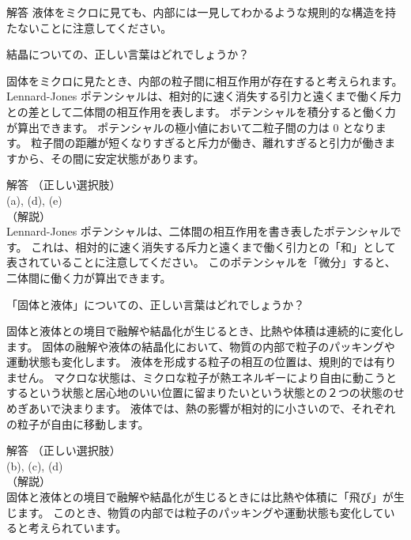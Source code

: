 \documentclass[uplatex,dvipdfmx,a4paper,11pt]{jsarticle}
\begin{document}
\begin{qlist}
\begin{itembox}[l]{解答}
            液体をミクロに見ても、内部には一見してわかるような規則的な構造を持たないことに注意してください。
        \end{itembox}
	\qitem 結晶についての、正しい言葉はどれでしょうか？
		\begin{qlist2}
			\qitem 固体をミクロに見たとき、内部の粒子間に相互作用が存在すると考えられます。
			\qitem Lennard-Jones ポテンシャルは、相対的に速く消失する引力と遠くまで働く斥力との差として二体間の相互作用を表します。
			\qitem ポテンシャルを積分すると働く力が算出できます。
			\qitem ポテンシャルの極小値において二粒子間の力は 0 となります。
			\qitem 粒子間の距離が短くなりすぎると斥力が働き、離れすぎると引力が働きますから、その間に安定状態があります。
		\end{qlist2}
        \vspace{3mm}
        \begin{itembox}[l]{解答}
            （正しい選択肢）\\
            (a), (d), (e)\\
            （解説）\\
            Lennard-Jones ポテンシャルは、二体間の相互作用を書き表したポテンシャルです。
            これは、相対的に速く消失する斥力と遠くまで働く引力との「和」として表されていることに注意してください。
            このポテンシャルを「微分」すると、二体間に働く力が算出できます。
        \end{itembox}
	\qitem 「固体と液体」についての、正しい言葉はどれでしょうか？
		\begin{qlist2}
			\qitem 固体と液体との境目で融解や結晶化が生じるとき、比熱や体積は連続的に変化します。
			\qitem 固体の融解や液体の結晶化において、物質の内部で粒子のパッキングや運動状態も変化します。
			\qitem 液体を形成する粒子の相互の位置は、規則的では有りません。
			\qitem マクロな状態は、ミクロな粒子が熱エネルギーにより自由に動こうとするという状態と居心地のいい位置に留まりたいという状態との２つの状態のせめぎあいで決まります。
			\qitem 液体では、熱の影響が相対的に小さいので、それぞれの粒子が自由に移動します。
		\end{qlist2}	
        \vspace{3mm}
        \begin{itembox}[l]{解答}
            （正しい選択肢）\\
            (b), (c), (d)\\
            （解説）\\
            固体と液体との境目で融解や結晶化が生じるときには比熱や体積に「飛び」が生じます。
            このとき、物質の内部では粒子のパッキングや運動状態も変化していると考えられています。
            

\end{itembox}
\end{qlist}
\end{document}
